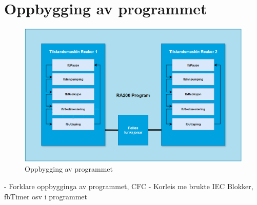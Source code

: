 \newpage
\section{Oppbygging av programmet}
\thispagestyle{fancy}

\begin{figure}[htbp]
    \centering
    \includegraphics[width=1\textwidth]{Figurar/Oppbygging_Program.png}
    \caption{Oppbygging av programmet}\label{fig:reaktorsoner}
\end{figure}

- Forklare oppbygginga av programmet, CFC
- Korleis me brukte IEC Blokker, fbTimer osv i programmet

\newpage